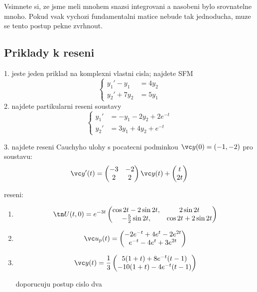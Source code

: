 Vsimnete si, ze jsme meli mnohem snazsi integrovani a nasobeni bylo srovnatelne
mnoho. Pokud vsak vychozi fundamentalni matice nebude tak jednoducha, muze se 
tento postup pekne zvrhnout.


\subsection{Priklady k reseni}
1. jeste jeden priklad na komplexni vlastni cisla; najdete SFM
\[
  \left\{
  \begin{aligned}
    y_1'-y_1&=4y_2\\
    y_2'+7y_2&=5y_1
  \end{aligned}\right.
\]
2. najdete partikularni reseni soustavy 
\[
  \left\{
  \begin{aligned}
    y_1'&=-y_1-2y_2+2e^{-t}\\
    y_2'&=3y_1+4y_2+e^{-t}
  \end{aligned}\right.
\]


3. najdete reseni Cauchyho ulohy s pocatecni podminkou $\vc y(0)=(-1,-2)$ pro soustavu:
\[
  \vc y'(t)=\begin{pmatrix}-3&-2\\2&2\end{pmatrix}\vc y(t)+
  \begin{pmatrix}
    t\\2t
  \end{pmatrix}
\]








\pagebreak
reseni:
\begin{enumerate}
\item
\[
  \tn U(t,0)=e^{-3t}\begin{pmatrix}
                     \cos 2t-2\sin 2t,& 2\sin 2t\\
                     -\frac52\sin 2t,&\cos2t+2\sin 2t
                     \end{pmatrix}
\]
\item
\[
  \vc u_p(t)=\begin{pmatrix}
                     -2e^{-t}+4e^t-2e^{2t}\\
                     e^{-t}-4e^t+3e^{2t}
             \end{pmatrix}
\]
\item
\[
  \vc y(t)=\frac13
  \begin{pmatrix}
    5(1+t)+8e^{-t}(t-1)\\
    -10(1+t)-4e^{-t}(t-1)
  \end{pmatrix}
\]

doporucuju postup cislo dva
\end{enumerate}





